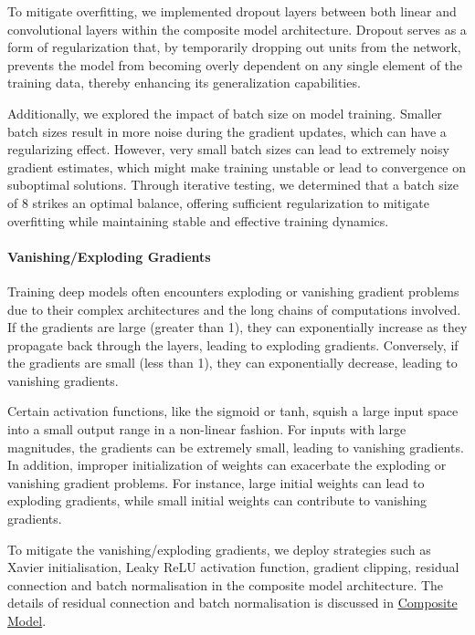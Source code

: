 To mitigate overfitting, we implemented dropout layers between both linear and convolutional layers within the composite model architecture. Dropout serves as a form of regularization that, by temporarily dropping out units from the network, prevents the model from becoming overly dependent on any single element of the training data, thereby enhancing its generalization capabilities.

Additionally, we explored the impact of batch size on model training. Smaller batch sizes result in more noise during the gradient updates, which can have a regularizing effect. However, very small batch sizes can lead to extremely noisy gradient estimates, which might make training unstable or lead to convergence on suboptimal solutions. Through iterative testing, we determined that a batch size of 8 strikes an optimal balance, offering sufficient regularization to mitigate overfitting while maintaining stable and effective training dynamics.

\paragraph*{Vanishing/Exploding Gradients}
\label{par:3_vanishing_exploding_gradients}
Training deep models often encounters exploding or vanishing gradient problems due to their complex architectures and the long chains of computations involved. If the gradients are large (greater than 1), they can exponentially increase as they propagate back through the layers, leading to exploding gradients. Conversely, if the gradients are small (less than 1), they can exponentially decrease, leading to vanishing gradients. 

Certain activation functions, like the sigmoid or tanh, squish a large input space into a small output range in a non-linear fashion. For inputs with large magnitudes, the gradients can be extremely small, leading to vanishing gradients. In addition, improper initialization of weights can exacerbate the exploding or vanishing gradient problems. For instance, large initial weights can lead to exploding gradients, while small initial weights can contribute to vanishing gradients.

To mitigate the vanishing/exploding gradients, we deploy strategies such as Xavier initialisation, Leaky ReLU activation function, gradient clipping, residual connection and batch normalisation in the composite model architecture. The details of residual connection and batch normalisation is discussed in \hyperref[subsec:3_composite_model]{Composite Model}.

